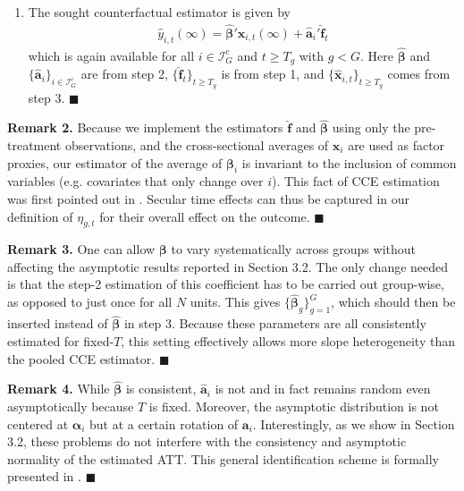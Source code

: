 \documentclass[12pt,fleqn]{article}
\def\*#1{\mathbf{#1}}
\def\+#1{\boldsymbol{#1}}
\begin{document}
\begin{enumerate}
\item The sought counterfactual estimator is given by
\begin{align}
\widehat y_{i,t}(\infty) = \widehat{\+\beta}'\widehat{\*x}_{i,t}(\infty) + \widehat{\*a}_i'\widehat{\*f}_t
\end{align}
which is again available for all $i\in \mathcal{I}_G^c$ and $t \geq T_g$ with $g < G$. Here $\widehat{\+\beta}$ and $\{\widehat{\*a}_i\}_{i\in \mathcal{I}_G^c}$ are from step 2, $\{\widehat{\*f}_t\}_{t \geq T_g}$ is from step 1, and $\{\widehat{\*x}_{i,t}\}_{ t \geq T_g}$ comes from step 3. $\blacksquare$
\end{enumerate}

\bigskip

\noindent \textbf{Remark 2.} Because we implement the estimators $\widehat{\*f}$ and $\widehat{\+\beta}$ using only the pre-treatment observations, and the cross-sectional averages of $\*x_i$ are used as factor proxies, our estimator of the average of $\+\beta_i$ is invariant to the inclusion of common variables (e.g. covariates that only change over $i$). This fact of CCE estimation was first pointed out in \citet{Brown_Schmidt_Wooldridge_2021}. Secular time effects can thus be captured in our definition of $\eta_{g,t}$ for their overall effect on the outcome. $\blacksquare$

\bigskip

\bigskip

\noindent \textbf{Remark 3.} One can allow $\+\beta$ to vary systematically across groups without affecting the asymptotic results reported in Section 3.2. The only change needed is that the step-2 estimation of this coefficient has to be carried out group-wise, as opposed to just once for all $N$ units. This gives $\{\widehat{\+\beta}_g\}_{g=1}^{G}$, which should then be inserted instead of $\widehat{\+\beta}$ in step 3. Because these parameters are all consistently estimated for fixed-$T$, this setting effectively allows more slope heterogeneity than the pooled CCE estimator. $\blacksquare$

\bigskip

\noindent \textbf{Remark 4.} While $\widehat{\+\beta}$ is consistent, $\widehat{\*a}_i$ is not and in fact remains random even asymptotically because $T$ is fixed. Moreover, the asymptotic distribution is not centered at $\+\alpha_i$ but at a certain rotation of $\*a_i$. Interestingly, as we show in Section 3.2, these problems do not interfere with the consistency and asymptotic normality of the estimated ATT. This general identification scheme is formally presented in \citet{brown2022generalized}. $\blacksquare$
\end{document}
